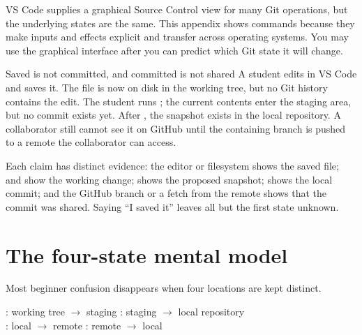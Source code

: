 VS Code supplies a graphical Source Control view for many Git operations, but
the underlying states are the same. This appendix shows commands because they
make inputs and effects explicit and transfer across operating systems. You may
use the graphical interface after you can predict which Git state it will
change.

\begin{workedexample}{Saved is not committed, and committed is not shared}
A student edits  in VS Code and saves it. The file is now on
disk in the working tree, but no Git history contains the edit. The student runs
; the current contents enter the staging area, but no
commit exists yet. After , the snapshot exists in the local
repository. A collaborator still cannot see it on GitHub until the containing
branch is pushed to a remote the collaborator can access.

Each claim has distinct evidence: the editor or filesystem shows the saved file;
 and  show the working change;
 shows the proposed snapshot;  shows the
local commit; and the GitHub branch or a fetch from the remote shows that the
commit was shared. Saying ``I saved it'' leaves all but the first state unknown.
\end{workedexample}

\section{The four-state mental model}

Most beginner confusion disappears when four locations are kept distinct.

\begin{center}

\smallskip
{\small
{}: working tree $\rightarrow$ staging \quad
{}: staging $\rightarrow$ local repository\\[2pt]
: local $\rightarrow$ remote \quad
{}: remote $\rightarrow$ local
}
\end{center}

